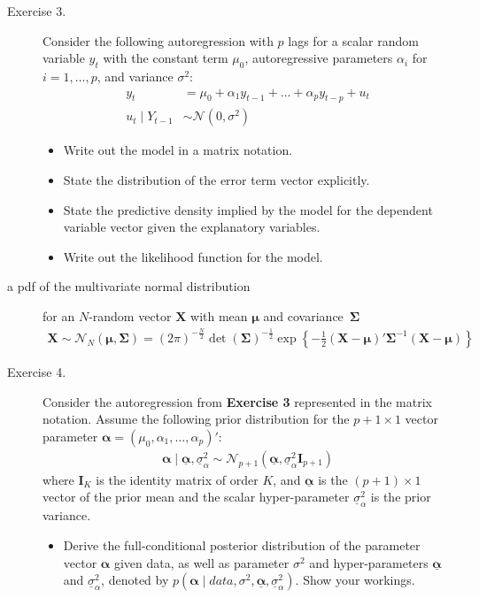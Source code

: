 \documentclass[12pt]{article}
\begin{document}
\begin{adjustwidth}{1cm}{1cm}
\begin{description}
\bigskip\item[Exercise 3.] Consider the following autoregression with $p$ lags for a scalar random variable $y_t$ with the constant term $\mu_0$, autoregressive parameters $\alpha_i$ for $i=1,\dots, p$, and variance $\sigma^2$:
\begin{align}
y_{t} &= \mu_0 + \alpha_1 y_{t-1} + \dots + \alpha_p y_{t-p} + u_t\\
u_t \mid Y_{t-1} &\sim\mathcal{N}\left(0,\sigma^2\right)
\end{align}
\begin{itemize}
\item Write out the model in a matrix notation.
\item State the distribution of the error term vector explicitly.
\item State the predictive density implied by the model for the dependent variable vector given the explanatory variables.
\item Write out the likelihood function for the model.
\end{itemize}
\item[a pdf of the multivariate normal distribution] for an $N$-random vector $\mathbf{X}$ with mean $\boldsymbol\mu$ and covariance~$\mathbf\Sigma$
\begin{align}
\mathbf{X}\sim\mathcal{N}_N\left(\boldsymbol\mu, \mathbf\Sigma\right) = (2\pi)^{-\frac{N}{2}}\det(\mathbf\Sigma)^{-\frac{1}{2}}\exp\left\{-\frac{1}{2}\left(\mathbf{X}-\boldsymbol\mu\right)'\mathbf\Sigma^{-1}\left(\mathbf{X}-\boldsymbol\mu\right) \right\}
\end{align} 


\newpage
\bigskip\item[Exercise 4.] Consider the autoregression from \textbf{Exercise 3} represented in the matrix notation. Assume the following prior distribution for the $p+1 \times 1$ vector parameter $\boldsymbol\alpha = (\mu_0, \alpha_1, \dots, \alpha_p)'$:
\begin{align}
\boldsymbol\alpha\mid\underline{\boldsymbol\alpha}, \underline{\sigma}^2_\alpha \sim\mathcal{N}_{p+1}\left(\underline{\boldsymbol\alpha}, \underline{\sigma}^2_\alpha \mathbf{I}_{p+1}\right)
\end{align}
where $\mathbf{I}_K$ is the identity matrix of order $K$, and $\underline{\boldsymbol\alpha}$ is the $(p+1) \times 1$ vector of the prior mean and the scalar hyper-parameter $\underline{\sigma}^2_\alpha$ is the prior variance.
\begin{itemize}
\item Derive the full-conditional posterior distribution of the parameter vector $\boldsymbol\alpha$ given data, as well as parameter $\sigma^2$ and hyper-parameters $\underline{\boldsymbol\alpha}$ and $\underline{\sigma}^2_\alpha$, denoted by $p\left(\boldsymbol\alpha\mid data, \sigma^2, \underline{\boldsymbol\alpha}, \underline{\sigma}^2_\alpha\right)$. Show your workings.
\end{itemize}



\end{description}
\end{adjustwidth}
\end{document}
